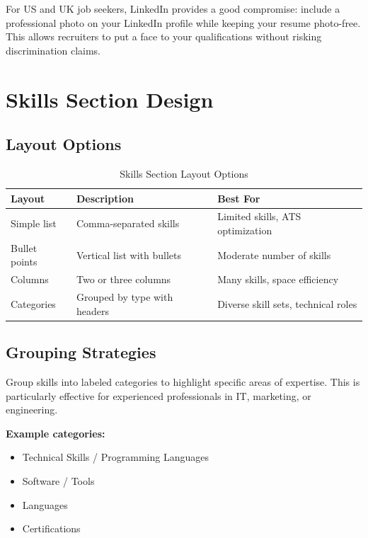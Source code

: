 \documentclass[11pt,a4paper]{article}
\begin{document}
\begin{warning}
For US and UK job seekers, LinkedIn provides a good compromise: include a professional photo on your LinkedIn profile while keeping your resume photo-free. This allows recruiters to put a face to your qualifications without risking discrimination claims.
\end{warning}

\section{Skills Section Design}

\subsection{Layout Options}

\begin{table}[h]
\centering
\begin{tabular}{@{}lll@{}}
\toprule
\textbf{Layout} & \textbf{Description} & \textbf{Best For} \\
\midrule
Simple list & Comma-separated skills & Limited skills, ATS optimization \\
Bullet points & Vertical list with bullets & Moderate number of skills \\
Columns & Two or three columns & Many skills, space efficiency \\
Categories & Grouped by type with headers & Diverse skill sets, technical roles \\
\bottomrule
\end{tabular}
\caption{Skills Section Layout Options}
\end{table}

\subsection{Grouping Strategies}

\begin{designtip}
Group skills into labeled categories to highlight specific areas of expertise. This is particularly effective for experienced professionals in IT, marketing, or engineering.

\textbf{Example categories:}
\begin{itemize}[noitemsep]
    \item Technical Skills / Programming Languages
    \item Software / Tools
    \item Languages
    \item Certifications
\end{itemize}
\end{designtip}
\end{document}
